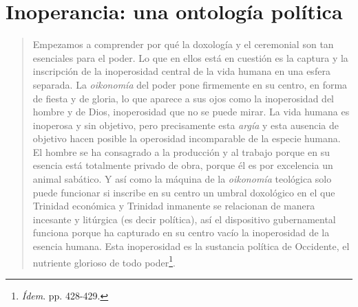 \documentclass{book}
\begin{document}
\section{Inoperancia: una ontología política}

\begin{quote}
Empezamos a comprender por qué la doxología y el ceremonial son tan
esenciales para el poder. Lo que en ellos está en cuestión es la captura
y la inscripción de la inoperosidad central de la vida humana en una
esfera separada. La \emph{oikonomía} del poder pone firmemente en su
centro, en forma de fiesta y de gloria, lo que aparece a sus ojos como
la inoperosidad del hombre y de Dios, inoperosidad que no se puede
mirar. La vida humana es inoperosa y sin objetivo, pero precisamente
esta \emph{argía} y esta ausencia de objetivo hacen posible la
operosidad incomparable de la especie humana. El hombre se ha consagrado
a la producción y al trabajo porque en su esencia está totalmente
privado de obra, porque él es por excelencia un animal sabático. Y así
como la máquina de la \emph{oikonomía} teológica solo puede funcionar si
inscribe en su centro un umbral doxológico en el que Trinidad económica
y Trinidad inmanente se relacionan de manera incesante y litúrgica (es
decir política), así el dispositivo gubernamental funciona porque ha
capturado en su centro vacío la inoperosidad de la esencia humana. Esta
inoperosidad es la sustancia política de Occidente, el nutriente
glorioso de todo poder\footnote{\emph{Ídem}. pp. 428-429.}.
\end{quote}
\end{document}
